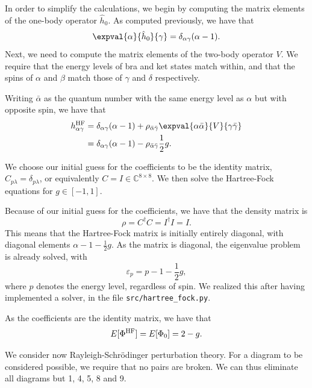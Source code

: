 In order to simplify the calculations, we begin by computing the matrix elements of the one-body operator $\hat{h}_0$.
As computed previously, we have that
\begin{equation*}
    \expval{\alpha}{\hat{h}_0}{\gamma} = \delta_{\alpha\gamma} (\alpha - 1).
\end{equation*}
Next, we need to compute the matrix elements of the two-body operator $V$.
We require that the energy levels of bra and ket states match within, and that the spins of $\alpha$ and $\beta$ match those of $\gamma$ and $\delta$ respectively.

Writing $\bar{\alpha}$ as the quantum number with the same energy level as $\alpha$ but with opposite spin, we have that
\begin{align*}
    h_{\alpha\gamma}^\HF &= \delta_{\alpha\gamma} (\alpha - 1) + \rho_{\bar{\alpha}\bar{\gamma}} \expval{\alpha\bar{\alpha}}{V}{\gamma\bar{\gamma}} \\
    &= \delta_{\alpha\gamma} (\alpha - 1) - \rho_{\bar{\alpha}\bar{\gamma}} \frac{1}{2} g.
\end{align*}

We choose our initial guess for the coefficients to be the identity matrix, $C_{p\lambda} = \delta_{p\lambda}$, or equivalently $C = I \in \mathbb{C}^{8 \times 8}$.
We then solve the Hartree-Fock equations for $g \in [-1, 1]$.

Because of our initial guess for the coefficients, we have that the density matrix is
\begin{equation*}
    \rho = C^\dagger C = I^\dagger I = I.
\end{equation*}
This means that the Hartree-Fock matrix is initially entirely diagonal, with diagonal elements $\alpha - 1 - \frac{1}{2} g$.
As the matrix is diagonal, the eigenvalue problem is already solved, with
\begin{equation*}
    \varepsilon_p = p - 1 - \frac{1}{2} g,
\end{equation*}
where $p$ denotes the energy level, regardless of spin.
We realized this after having implemented a solver, in the file \verb|src/hartree_fock.py|.

As the coefficients are the identity matrix, we have that
\begin{equation*}
    E[\Phi^{\mathrm{HF}}] = E[\Phi_0] = 2 - g.
\end{equation*}

We consider now Rayleigh-Schr\"odinger perturbation theory.
For a diagram to be considered possible, we require that no pairs are broken.
We can thus eliminate all diagrams but 1, 4, 5, 8 and 9.

